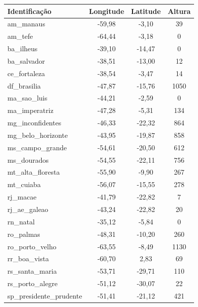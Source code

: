\begin{table}[h]
\begin{center}
\begin{tabular}{|l|c|c|c|}
\hline
Identificação           & Longitude & Latitude & Altura \\ \hline
am\_manaus               & -59,98  & -3,10   & 39 \\ \hline
am\_tefe                 & -64,44  & -3,18   & 0 \\ \hline
ba\_ilheus               & -39,10  & -14,47  & 0 \\ \hline
ba\_salvador             & -38,51  & -13,00  & 12 \\ \hline
ce\_fortaleza            & -38,54  & -3,47   & 14 \\ \hline
df\_brasilia             & -47,87  & -15,76  & 1050 \\ \hline
ma\_sao\_luis             & -44,21  & -2,59   & 0 \\ \hline
ma\_imperatriz           & -47,28  & -5,31   & 134 \\ \hline
mg\_inconfidentes        & -46,33  & -22,32  & 864 \\ \hline
mg\_belo\_horizonte       & -43,95  & -19,87  & 858 \\ \hline
ms\_campo\_grande         & -54,61  & -20,50  & 612 \\ \hline
ms\_dourados             & -54,55  & -22,11  & 756 \\ \hline
mt\_alta\_floresta        & -55,90  & -9,90   & 267 \\ \hline
mt\_cuiaba               & -56,07  & -15,55  & 278 \\ \hline
rj\_macae                & -41,79  & -22,82  & 7 \\ \hline
rj\_ae\_galeao            & -43,24  & -22,82  & 20 \\ \hline
rn\_natal                & -35,12  & -5,84   & 0 \\ \hline
ro\_palmas               & -48,31  & -10,20  & 260 \\ \hline
ro\_porto\_velho          & -63,55  & -8,49   & 1130 \\ \hline
rr\_boa\_vista            & -60,70  & 2,83    & 69 \\ \hline
rs\_santa\_maria          & -53,71  & -29,71  & 110 \\ \hline
rs\_porto\_alegre         & -51,12  & -30,07  & 22 \\ \hline
sp\_presidente\_prudente  & -51,41  & -21,12  & 421 \\ \hline

\end{tabular}
\end{center}
\end{table}
